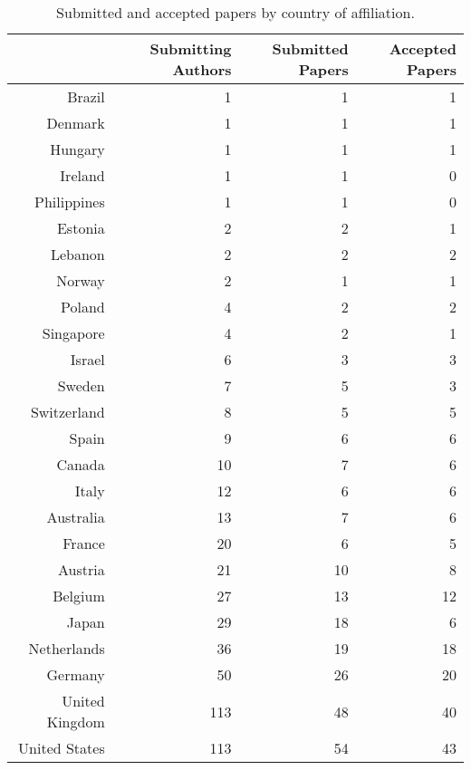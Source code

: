 \documentclass[12pt]{article}
\begin{document}
\begin{table}[ht]
\caption{Submitted and accepted papers by country of affiliation.}
\centering
\begin{tabular}{rrrr}
  \hline
 & Submitting Authors & Submitted Papers & Accepted Papers \\ 
  \hline
Brazil &   1 &   1 &   1 \\ 
  Denmark &   1 &   1 &   1 \\ 
  Hungary &   1 &   1 &   1 \\ 
  Ireland &   1 &   1 &   0 \\ 
  Philippines &   1 &   1 &   0 \\ 
  Estonia &   2 &   2 &   1 \\ 
  Lebanon &   2 &   2 &   2 \\ 
  Norway &   2 &   1 &   1 \\ 
  Poland &   4 &   2 &   2 \\ 
  Singapore &   4 &   2 &   1 \\ 
  Israel &   6 &   3 &   3 \\ 
  Sweden &   7 &   5 &   3 \\ 
  Switzerland &   8 &   5 &   5 \\ 
  Spain &   9 &   6 &   6 \\ 
  Canada &  10 &   7 &   6 \\ 
  Italy &  12 &   6 &   6 \\ 
  Australia &  13 &   7 &   6 \\ 
  France &  20 &   6 &   5 \\ 
  Austria &  21 &  10 &   8 \\ 
  Belgium &  27 &  13 &  12 \\ 
  Japan &  29 &  18 &   6 \\ 
  Netherlands &  36 &  19 &  18 \\ 
  Germany &  50 &  26 &  20 \\ 
  United Kingdom & 113 &  48 &  40 \\ 
  United States & 113 &  54 &  43 \\ 
   \hline
\end{tabular}
\label{tab:country}
\end{table}



\end{document}
